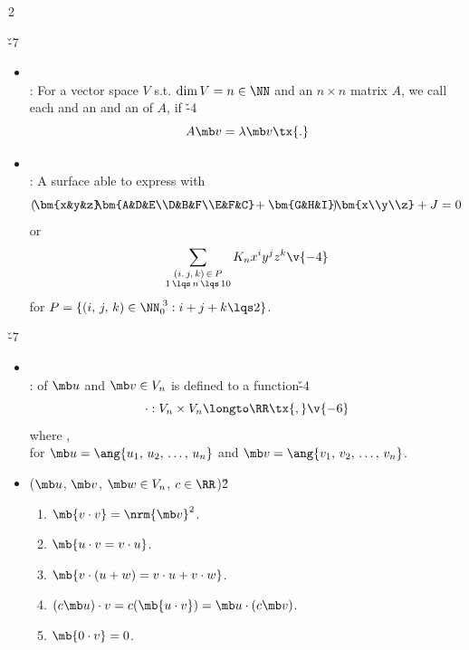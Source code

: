 \documentclass[dvipdfmx,a4paper,titlepage,9pt]{jsarticle}
\begin{document}
\begin{multicols*}{2}
\newpage

 \v{-7}
\begin{itemize}[label={-}]
\item{} \\
: For a vector space $V$ s.t. $\dim V=n\in\NN$ and an $n\times n$ matrix $A$, we call each  and  an  and  an  of $A$, if \v{-4}
$$A\mb v=\lambda\mb v\tx{.}$$
\item{}  \\
\;\;: A surface able to express with
$$\left(\!\bm{x&y&z}\!\!\bm{A&D&E\\D&B&F\\E&F&C}\!+\bm{G&H&I}\!\right)\!\!\bm{x\\y\\z}+J=0$$
or
$$\sum_{\substack{(i.\,j,\,k)\,\in\,P\\1\,\lqs\,n\,\lqs\,10}}K_nx^iy^jz^k\v{-4}$$
for $P=\{(i,\,j,\,k)\in\NN_0^{\;3}:i+j+k\lqs2\}$.\\
\end{itemize}

 \v{-7}
\begin{itemize}[label={-}]
\item{} \\
:  of $\mb u$ and $\mb v\in V_n$ is defined to a function\v{-4}
$$\cdot: V_n\times V_n\longto \RR\tx{,}\v{-6}$$
\;\;where ,\\
\;\;for $\mb u=\ang{u_1,\,u_2,\,\ldots,\,u_n}$ and $\mb v=\ang{v_1,\,v_2,\,\ldots,\,v_n}$.\\

\item{} ($\mb u$, $\mb v$, $\mb w\in V_n$, $c\in\RR$)\v2
\begin{enumerate}[label=(\roman*)]
\setlength{\leftskip}{-2pt}
\item $\mb{v\cdot v}=\nrm{\mb v}^2$.
\item $\mb{u\cdot v=v\cdot u}$.
\item $\mb{v\cdot(u+w)=v\cdot u+v\cdot w}$.
\item $(c\mb u)\cdot v=c(\mb{u\cdot v})=\mb u\cdot(c\mb v)$.
\item $\mb{0\cdot v}=0$. \\
\end{enumerate}


\end{itemize}
\end{multicols*}
\end{document}
